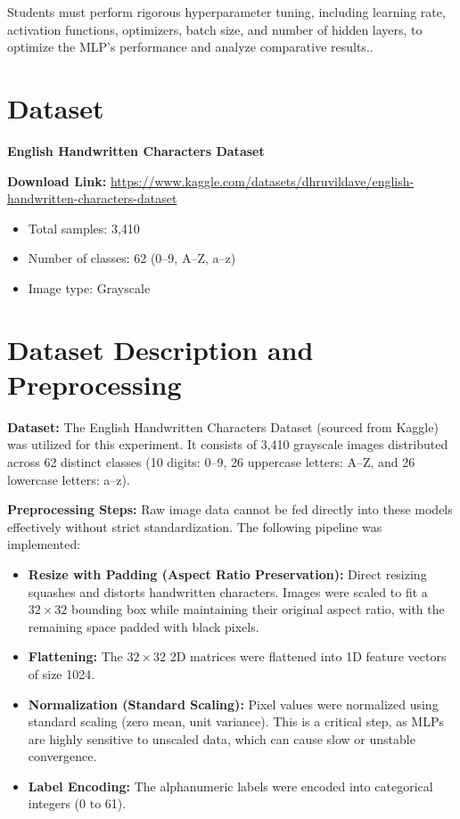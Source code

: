 \documentclass[11pt]{article}
\begin{document}
Students must perform rigorous hyperparameter tuning, including learning rate, activation functions, optimizers, batch size, and number of hidden layers, to optimize the MLP's performance and analyze comparative results..

\section*{Dataset}
\textbf{English Handwritten Characters Dataset}

\textbf{Download Link:}  
\href{https://www.kaggle.com/datasets/dhruvildave/english-handwritten-characters-dataset}{https://www.kaggle.com/datasets/dhruvildave/english-handwritten-characters-dataset}

\begin{itemize}
    \item Total samples: 3,410
    \item Number of classes: 62 (0--9, A--Z, a--z)
    \item Image type: Grayscale
\end{itemize}
\section*{Dataset Description and Preprocessing}

\textbf{Dataset:} The English Handwritten Characters Dataset (sourced from Kaggle) was utilized for this experiment. It consists of 3,410 grayscale images distributed across 62 distinct classes (10 digits: 0--9, 26 uppercase letters: A--Z, and 26 lowercase letters: a--z).

\textbf{Preprocessing Steps:} Raw image data cannot be fed directly into these models effectively without strict standardization. The following pipeline was implemented:
\begin{itemize}
    \item \textbf{Resize with Padding (Aspect Ratio Preservation):} Direct resizing squashes and distorts handwritten characters. Images were scaled to fit a $32 \times 32$ bounding box while maintaining their original aspect ratio, with the remaining space padded with black pixels.
    
    \item \textbf{Flattening:} The $32 \times 32$ 2D matrices were flattened into 1D feature vectors of size 1024.
    
    \item \textbf{Normalization (Standard Scaling):} Pixel values were normalized using standard scaling (zero mean, unit variance). This is a critical step, as MLPs are highly sensitive to unscaled data, which can cause slow or unstable convergence.
    
    \item \textbf{Label Encoding:} The alphanumeric labels were encoded into categorical integers (0 to 61).
\end{itemize}
\end{document}
